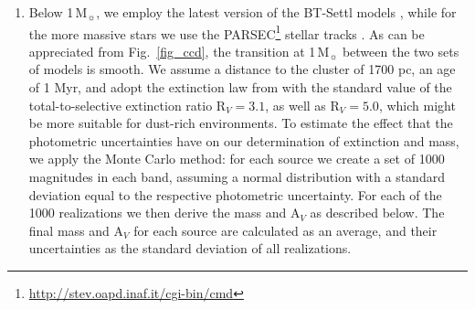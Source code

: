 \documentclass[a4paper,fleqn,usenatbib]{mnras}
\begin{document}
\begin{enumerate}
\item Below 1\,M$_{\sun}$, we employ the latest version of the BT-Settl models \citep{baraffe15}, while for the more massive stars we use
the PARSEC\footnote{\url{http://stev.oapd.inaf.it/cgi-bin/cmd}} stellar tracks \citep{bressan12, chen14}.
As can be appreciated from Fig.~\ref{fig_ccd}, the transition at 1\,M$_{\sun}$ between the two sets of models is smooth.
We assume a distance to the cluster of 1700 pc, an age of 1 Myr, and adopt the extinction law from 
\citet{cardelli89} with the standard value of the total-to-selective extinction ratio R$_V=3.1$, as well as R$_V=5.0$, which
might be more suitable for dust-rich environments. 
To estimate the effect that the photometric uncertainties have on our determination of extinction and mass, we apply the Monte Carlo method:
for each source we create a set of 1000 magnitudes in each band, assuming a normal distribution with a standard deviation equal
to the respective photometric uncertainty. For each of the 1000 realizations we then derive the mass and A$_V$ as described below. 
The final mass and A$_V$ for each source are calculated as an average, and their uncertainties as the standard deviation of all realizations.



\end{enumerate}
\end{document}
